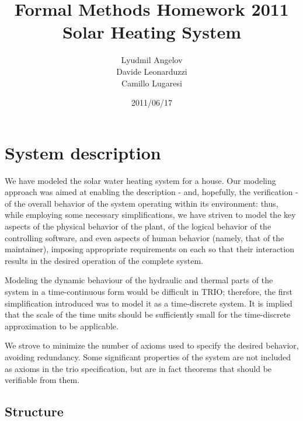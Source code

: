 \documentclass[a4paper,12pt]{article}
\begin{document}
\title{Formal Methods Homework 2011\\
Solar Heating System}
\author{Lyudmil Angelov\\
Davide Leonarduzzi\\
Camillo Lugaresi}
\date{2011/06/17}
\maketitle

\section{System description}

We have modeled the solar water heating system for a house. Our modeling approach was aimed at enabling the description - and, hopefully, the verification - of the overall behavior of the system operating within its environment: thus, while employing some necessary simplifications, we have striven to model the key aspects of the physical behavior of the plant, of the logical behavior of the controlling software, and even aspects of human behavior (namely, that of the maintainer), imposing appropriate requirements on each so that their interaction results in the desired operation of the complete system.

Modeling the dynamic behaviour of the hydraulic and thermal parts of the system in a time-continuous form would be difficult in TRIO; therefore, the first simplification introduced was to model it as a time-discrete system. It is implied that the scale of the time units should be sufficiently small for the time-discrete approximation to be applicable.

We strove to minimize the number of axioms used to specify the desired behavior, avoiding redundancy. Some significant properties of the system are not included as axioms in the trio specification, but are in fact theorems that should be verifiable from them.

\pagebreak
\subsection{Structure}
\end{document}
